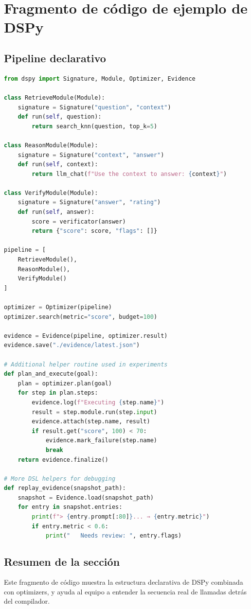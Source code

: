 \section{Fragmento de código de ejemplo de DSPy}

\subsection{Pipeline declarativo}

\begin{lstlisting}[language=Python]
from dspy import Signature, Module, Optimizer, Evidence

class RetrieveModule(Module):
    signature = Signature("question", "context")
    def run(self, question):
        return search_knn(question, top_k=5)

class ReasonModule(Module):
    signature = Signature("context", "answer")
    def run(self, context):
        return llm_chat(f"Use the context to answer: {context}")

class VerifyModule(Module):
    signature = Signature("answer", "rating")
    def run(self, answer):
        score = verificator(answer)
        return {"score": score, "flags": []}

pipeline = [
    RetrieveModule(),
    ReasonModule(),
    VerifyModule()
]

optimizer = Optimizer(pipeline)
optimizer.search(metric="score", budget=100)

evidence = Evidence(pipeline, optimizer.result)
evidence.save("./evidence/latest.json")

# Additional helper routine used in experiments
def plan_and_execute(goal):
    plan = optimizer.plan(goal)
    for step in plan.steps:
        evidence.log(f"Executing {step.name}")
        result = step.module.run(step.input)
        evidence.attach(step.name, result)
        if result.get("score", 100) < 70:
            evidence.mark_failure(step.name)
            break
    return evidence.finalize()

# More DSL helpers for debugging
def replay_evidence(snapshot_path):
    snapshot = Evidence.load(snapshot_path)
    for entry in snapshot.entries:
        print(f"> {entry.prompt[:80]}... → {entry.metric}")
        if entry.metric < 0.6:
            print("   Needs review: ", entry.flags)
\end{lstlisting}

\subsection{Resumen de la sección}

Este fragmento de código muestra la estructura declarativa de DSPy combinada con optimizers, y ayuda al equipo a entender la secuencia real de llamadas detrás del compilador.


